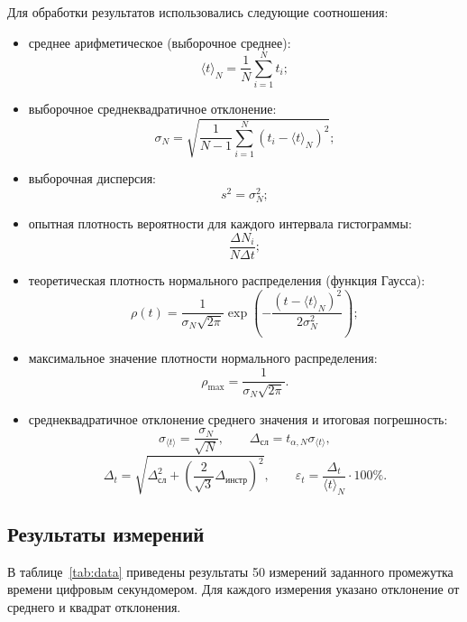 \documentclass[a4paper,14pt]{extarticle}
\begin{document}
	Для обработки результатов использовались следующие соотношения:
	\begin{itemize}
		\item среднее арифметическое (выборочное среднее):
		\[
		\langle t \rangle_N = \frac{1}{N} \sum_{i=1}^{N} t_i;
		\]
		\item выборочное среднеквадратичное отклонение:
		\[
		\sigma_N = \sqrt{\frac{1}{N-1} \sum_{i=1}^{N} \left( t_i - \langle t \rangle_N \right)^2};
		\]
		\item выборочная дисперсия:
		\[
		s^2 = \sigma_N^2;
		\]
		\item опытная плотность вероятности для каждого интервала гистограммы:
		\[
		\frac{\Delta N_i}{N \Delta t};
		\]
		\item теоретическая плотность нормального распределения (функция Гаусса):
		\[
		\rho(t) = \frac{1}{\sigma_N \sqrt{2\pi}} \exp\left( -\frac{(t - \langle t \rangle_N)^2}{2\sigma_N^2} \right);
		\]
		\item максимальное значение плотности нормального распределения:
		\[
		\rho_{\max} = \frac{1}{\sigma_N \sqrt{2\pi}}.
		\]
		\item среднеквадратичное отклонение среднего значения и итоговая погрешность:
		\[
		\sigma_{\langle t \rangle} = \frac{\sigma_N}{\sqrt{N}}, \qquad
		\Delta_{\text{сл}} = t_{\alpha,N}\sigma_{\langle t \rangle},
		\]
		\[
		\Delta_t = \sqrt{\Delta_{\text{сл}}^2 + \left(\frac{2}{\sqrt{3}}\Delta_{\text{инстр}}\right)^2},
		\qquad
		\varepsilon_t = \frac{\Delta_t}{\langle t \rangle_N}\cdot100\%.
		\]
	\end{itemize}

	\subsection{Результаты измерений}
	
	В таблице~\ref{tab:data} приведены результаты 50 измерений заданного промежутка времени цифровым секундомером. Для каждого измерения указано отклонение от среднего и квадрат отклонения.
	
\end{document}
